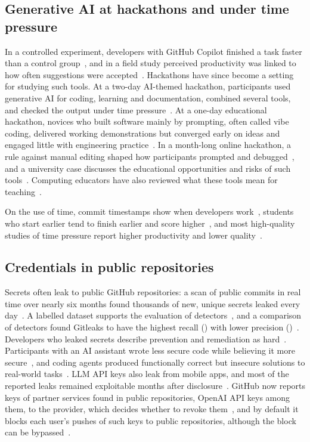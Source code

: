 \documentclass{article}
\begin{document}
\subsection{Generative AI at hackathons and under time pressure}
In a controlled experiment, developers with GitHub Copilot finished a task faster than a control group~\cite{peng2023copilot}, and in a field study perceived productivity was linked to how often suggestions were accepted~\cite{ziegler2024copilot}. Hackathons have since become a setting for studying such tools. At a two-day AI-themed hackathon, participants used generative AI for coding, learning and documentation, combined several tools, and checked the output under time pressure~\cite{zhou2026quickbuild}. At a one-day educational hackathon, novices who built software mainly by prompting, often called vibe coding, delivered working demonstrations but converged early on ideas and engaged little with engineering practice~\cite{gama2025vibes}. In a month-long online hackathon, a rule against manual editing shaped how participants prompted and debugged~\cite{chen2026codeforall}, and a university case discusses the educational opportunities and risks of such tools~\cite{sajja2024genaihack}. Computing educators have also reviewed what these tools mean for teaching~\cite{denny2024computinged}.

On the use of time, commit timestamps show when developers work~\cite{claes2018night}, students who start earlier tend to finish earlier and score higher~\cite{kazerouni2017procrastination}, and most high-quality studies of time pressure report higher productivity and lower quality~\cite{kuutila2020timepressure}.

\subsection{Credentials in public repositories}
Secrets often leak to public GitHub repositories: a scan of public commits in real time over nearly six months found thousands of new, unique secrets leaked every day~\cite{meli2019git}. A labelled dataset supports the evaluation of detectors~\cite{basak2023secretbench}, and a comparison of detectors found Gitleaks to have the highest recall (\gitleaksrecall) with lower precision (\gitleaksprecision)~\cite{basak2023tools}. Developers who leaked secrets describe prevention and remediation as hard~\cite{krause2022pushed}. Participants with an AI assistant wrote less secure code while believing it more secure~\cite{perry2023insecure}, and coding agents produced functionally correct but insecure solutions to real-world tasks~\cite{zhao2025vibesafe}. LLM API keys also leak from mobile apps, and most of the reported leaks remained exploitable months after disclosure~\cite{gao2026mindyourkey}. GitHub now reports keys of partner services found in public repositories, OpenAI API keys among them, to the provider, which decides whether to revoke them~\cite{github2026partners,github2026patterns}, and by default it blocks each user's pushes of such keys to public repositories, although the block can be bypassed~\cite{github2026pushprotection}.
\end{document}
